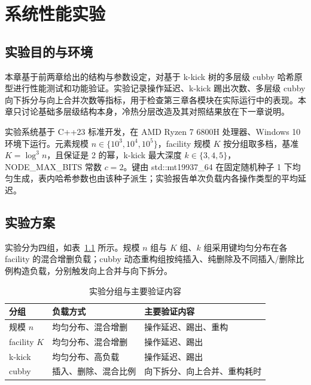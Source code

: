 \chapter{系统性能实验}
\label{ch:exp}

\section{实验目的与环境}

本章基于前两章给出的结构与参数设定，对基于 k-kick 树的多层级 cubby 哈希原型进行性能测试和功能验证。实验记录操作延迟、k-kick 踢出次数、多层级 cubby 向下拆分与向上合并次数等指标，用于检查第三章各模块在实际运行中的表现\cite{bender2022otsh,bender2024sosa}。本章只讨论基础多层级结构本身，冷热分层改造及其对照结果放在下一章说明。

实验系统基于 C++23 标准开发，在 AMD Ryzen 7 6800H 处理器、Windows 10 环境下运行。元素规模 \(n\in\{10^3,10^4,10^5\}\)，facility 规模 \(K\) 按分组取多档，基准 \(K=\log^3 n\)，且保证是 2 的幂，k-kick 最大深度 \(k\in\{3,4,5\}\)，NODE\_MAX\_BITS 常数 \(c=2\)。键由 std::mt19937\_64 在固定随机种子 1 下均匀生成，表内哈希参数也由该种子派生；实验报告单次负载内各操作类型的平均延迟。

\section{实验方案}

实验分为四组，如表~\ref{tab:exp-plan} 所示。规模 \(n\) 组与 \(K\) 组、\(k\) 组采用键均匀分布在各 facility 的混合增删负载；cubby 动态重构组按纯插入、纯删除及不同插入/删除比例构造负载，分别触发向上合并与向下拆分。

\begin{table}[htbp]
  \centering
  \caption{实验分组与主要验证内容}
  \label{tab:exp-plan}
  \small
  \begin{tabular}{p{1.6cm}p{3.6cm}p{5.8cm}}
    \toprule
    分组 & 负载方式 & 主要验证内容 \\
    \midrule
    规模 \(n\) & 均匀分布、混合增删 & 操作延迟、踢出、重构 \\
    facility \(K\) & 均匀分布、混合增删 & 操作延迟、踢出 \\
    k-kick & 均匀分布、高负载 & 操作延迟、踢出 \\
    cubby & 插入、删除、混合比例 & 向下拆分、向上合并、重构耗时 \\
    \bottomrule
  \end{tabular}
\end{table}

